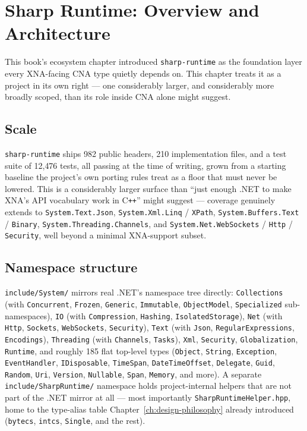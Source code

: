 \chapter{Sharp Runtime: Overview and Architecture}
\label{ch:sharp-runtime-overview}

This book's ecosystem chapter introduced \texttt{sharp-runtime} as the foundation layer every
XNA-facing CNA type quietly depends on. This chapter treats it as a project in its own right
--- one considerably larger, and considerably more broadly scoped, than its role inside CNA
alone might suggest.

\section{Scale}

\texttt{sharp-runtime} ships 982 public headers, 210 implementation files, and a test suite
of 12{,}476 tests, all passing at the time of writing, grown from a starting baseline the
project's own porting rules treat as a floor that must never be lowered. This is a
considerably larger surface than ``just enough .NET to make XNA's API vocabulary work in
C\texttt{++}'' might suggest --- coverage genuinely extends to \texttt{System.Text.Json},
\texttt{System.Xml.Linq} / \texttt{XPath}, \texttt{System.Buffers.Text} / \texttt{Binary},
\texttt{System.Threading.Channels}, and \texttt{System.Net.WebSockets} / \texttt{Http} /
\texttt{Security}, well beyond a minimal XNA-support subset.

\section{Namespace structure}

\texttt{include/System/} mirrors real .NET's namespace tree directly:
\texttt{Collections} (with \texttt{Concurrent}, \texttt{Frozen}, \texttt{Generic},
\texttt{Immutable}, \texttt{ObjectModel}, \texttt{Specialized} sub-namespaces),
\texttt{IO} (with \texttt{Compression}, \texttt{Hashing}, \texttt{IsolatedStorage}),
\texttt{Net} (with \texttt{Http}, \texttt{Sockets}, \texttt{WebSockets}, \texttt{Security}),
\texttt{Text} (with \texttt{Json}, \texttt{RegularExpressions}, \texttt{Encodings}),
\texttt{Threading} (with \texttt{Channels}, \texttt{Tasks}), \texttt{Xml}, \texttt{Security},
\texttt{Globalization}, \texttt{Runtime}, and roughly 185 flat top-level types
(\texttt{Object}, \texttt{String}, \texttt{Exception}, \texttt{EventHandler},
\texttt{IDisposable}, \texttt{TimeSpan}, \texttt{DateTimeOffset}, \texttt{Delegate},
\texttt{Guid}, \texttt{Random}, \texttt{Uri}, \texttt{Version}, \texttt{Nullable},
\texttt{Span}, \texttt{Memory}, and more). A separate \texttt{include/SharpRuntime/}
namespace holds project-internal helpers that are not part of the .NET mirror at all ---
most importantly \texttt{SharpRuntimeHelper.hpp}, home to the type-alias table
Chapter~\ref{ch:design-philosophy} already introduced (\texttt{bytecs},
\texttt{intcs}, \texttt{Single}, and the rest).

